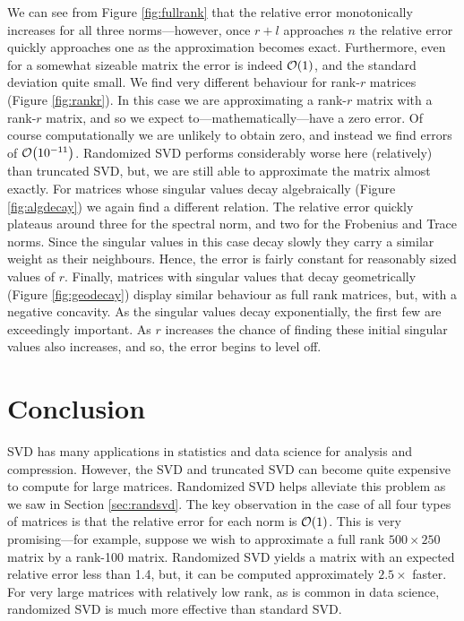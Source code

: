 \documentclass[11pt, a4paper, twocolumn]{article}
\let\originalleft\left
\let\originalright\right
\renewcommand{\left}{\mathopen{}\mathclose\bgroup\originalleft}
\renewcommand{\right}{\aftergroup\egroup\originalright}
\providecommand{\bigO}[1]{\ensuremath{\mathop{}\mathopen{}\mathcal{O}\mathopen{}\left(#1\right)}}
\begin{document}
We can see from Figure \ref{fig:fullrank} that the relative error monotonically increases for all three norms---however, once $r + l$ approaches $n$ the relative error quickly approaches one as the approximation becomes exact. Furthermore, even for a somewhat sizeable matrix the error is indeed $\bigO{1}$, and the standard deviation quite small. We find very different behaviour for rank-$r$ matrices (Figure \ref{fig:rankr}). In this case we are approximating a rank-$r$ matrix with a rank-$r$ matrix, and so we expect to---mathematically---have a zero error. Of course computationally we are unlikely to obtain zero, and instead we find errors of $\bigO{10^{-11}}$. Randomized SVD performs considerably worse here (relatively) than truncated SVD, but, we are still able to approximate the matrix almost exactly. For matrices whose singular values decay algebraically (Figure \ref{fig:algdecay}) we again find a different relation. The relative error quickly plateaus around three for the spectral norm, and two for the Frobenius and Trace norms. Since the singular values in this case decay slowly they carry a similar weight as their neighbours. Hence, the error is fairly constant for reasonably sized values of $r$. Finally, matrices with singular values that decay geometrically (Figure \ref{fig:geodecay}) display similar behaviour as full rank matrices, but, with a negative concavity. As the singular values decay exponentially, the first few are exceedingly important. As $r$ increases the chance of finding these initial singular values also increases, and so, the error begins to level off.

\section{Conclusion}
\label{sec:conc}
SVD has many applications in statistics and data science for analysis and compression. However, the SVD and truncated SVD can become quite expensive to compute for large matrices. Randomized SVD helps alleviate this problem as we saw in Section \ref{sec:randsvd}. The key observation in the case of all four types of matrices is that the relative error for each norm is $\bigO{1}$. This is very promising---for example, suppose we wish to approximate a full rank $500 \times 250$ matrix by a rank-100 matrix. Randomized SVD yields a matrix with an expected relative error less than 1.4, but, it can be computed approximately $2.5 \times$ faster. For very large matrices with relatively low rank, as is common in data science, randomized SVD is much more effective than standard SVD.


\end{document}
